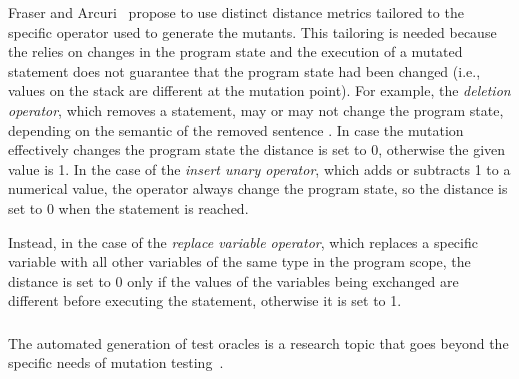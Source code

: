 Fraser and Arcuri~\cite{fraser2015achieving} propose to use distinct distance metrics tailored to the specific operator used to generate the mutants.
This tailoring is needed because the  relies on changes in the program state and the execution of a mutated statement does not guarantee that the program state had been changed (i.e., values on the stack are different at the mutation point).
For example, the \textit{deletion operator}, which removes a statement, may or may not change the program state, depending on the semantic of the removed sentence . In case the mutation effectively changes the program state the distance is set to 0, otherwise the given value is 1.
In the case of the \textit{insert unary operator}, which adds or subtracts 1 to a numerical value, the operator always change the program state, so the distance is set to 0 when the statement is reached. 

Instead, in the case of the \textit{replace variable operator}, which replaces a specific variable with all other variables of the same type in the program scope, the distance is set to 0 only if the values of the variables being exchanged are different before executing the statement, otherwise it is set to 1.

\subsubsection{}
\label{sec:oraclesGeneration:codeDriven}

The automated generation of test oracles is a research topic that goes beyond the specific needs of mutation testing~\cite{Barr:Oracles:15,OLIVEIRA:Oracles:2014}.

